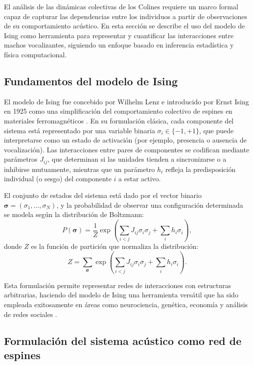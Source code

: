 El análisis de las dinámicas colectivas de los Colines requiere un 
marco formal capaz de capturar las dependencias entre los 
individuos a partir de observaciones de su comportamiento 
acústico. En esta sección se describe el uso del modelo de 
Ising como herramienta para representar y cuantificar las 
interacciones entre machos vocalizantes, siguiendo un enfoque 
basado en inferencia estadística y física computacional.

\subsection{Fundamentos del modelo de Ising}

El modelo de Ising fue concebido por Wilhelm Lenz e introducido por Ernst Ising en 1925 como 
una simplificación del comportamiento colectivo de espines en 
materiales ferromagnéticos \cite{ising1925beitrag}. En su 
formulación clásica, cada componente del sistema está 
representado por una variable binaria \( \sigma_i \in \{-1, +1\} \), 
que puede interpretarse como un estado de activación 
(por ejemplo, presencia o ausencia de vocalización). Las 
interacciones entre pares de componentes se codifican mediante 
parámetros \( J_{ij} \), que determinan si las unidades tienden 
a sincronizarse o a inhibirse mutuamente, mientras que un 
parámetro \( h_i \) refleja la predisposición individual (o 
sesgo) del componente \( i \) a estar activo.

El conjunto de estados del sistema está dado por el vector 
binario 
\(\boldsymbol{\sigma} = (\sigma_1, \dots, \sigma_N)\), y la 
probabilidad de observar una configuración determinada se modela 
según la distribución de Boltzmann:
\[
P(\boldsymbol{\sigma}) = \frac{1}{Z} \exp\left( \sum_{i<j} J_{ij} \sigma_i \sigma_j + \sum_{i} h_i \sigma_i \right),
\]
donde \( Z \) es la función de partición que normaliza la 
distribución:
\[
Z = \sum_{\boldsymbol{\sigma}} \exp\left( \sum_{i<j} J_{ij} \sigma_i \sigma_j + \sum_i h_i \sigma_i \right).
\]

Esta formulación permite representar redes de interacciones con 
estructuras arbitrarias, haciendo del modelo de Ising una 
herramienta versátil que ha sido empleada exitosamente en áreas 
como neurociencia, genética, economía y análisis de redes 
sociales \cite{chau2017inverse}.

\subsection{Formulación del sistema acústico como red de espines}

